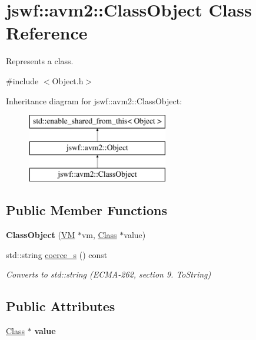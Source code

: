 \hypertarget{classjswf_1_1avm2_1_1_class_object}{\section{jswf\+:\+:avm2\+:\+:Class\+Object Class Reference}
\label{classjswf_1_1avm2_1_1_class_object}
}


Represents a class.  




{\ttfamily \#include $<$Object.\+h$>$}

Inheritance diagram for jswf\+:\+:avm2\+:\+:Class\+Object\+:\begin{figure}[H]
\begin{center}
\leavevmode
\includegraphics[height=3.000000cm]{classjswf_1_1avm2_1_1_class_object}
\end{center}
\end{figure}
\subsection*{Public Member Functions}
\begin{DoxyCompactItemize}
\item 
\hypertarget{classjswf_1_1avm2_1_1_class_object_a7c1bcfada2136ea23f6d34b4d11ce211}{{\bfseries Class\+Object} (\hyperlink{classjswf_1_1avm2_1_1_v_m}{V\+M} $\ast$vm, \hyperlink{classjswf_1_1avm2_1_1_class}{Class} $\ast$value)}\label{classjswf_1_1avm2_1_1_class_object_a7c1bcfada2136ea23f6d34b4d11ce211}

\item 
std\+::string \hyperlink{classjswf_1_1avm2_1_1_class_object_ad19a4ad7c166a694e0f0f349727fc9c2}{coerce\+\_\+s} () const 
\begin{DoxyCompactList}\small\item\em Converts to {\ttfamily std\+::string} (E\+C\+M\+A-\/262, section 9. {\itshape To\+String}) \end{DoxyCompactList}\end{DoxyCompactItemize}
\subsection*{Public Attributes}
\begin{DoxyCompactItemize}
\item 
\hypertarget{classjswf_1_1avm2_1_1_class_object_a8910e99a301c2caddd9334694d42acc5}{\hyperlink{classjswf_1_1avm2_1_1_class}{Class} $\ast$ {\bfseries value}}\label{classjswf_1_1avm2_1_1_class_object_a8910e99a301c2caddd9334694d42acc5}

\end{DoxyCompactItemize}
